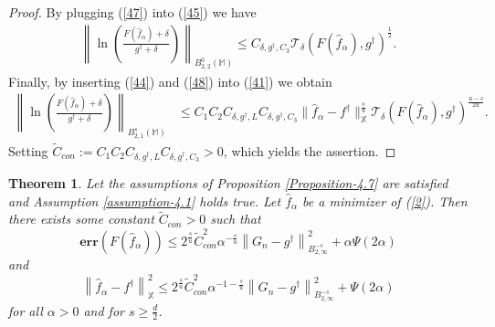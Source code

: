 \documentclass[10pt]{iopart}
\newtheorem{theorem}{Theorem}[section]
\begin{document}
\begin{proof}
By plugging (\ref{47}) into (\ref{45}) we have
\begin{align}\label{48}
 \left\|\ln\left(\frac{F(\widehat{f}_{\alpha})+\delta}{g^{\dagger}+\delta}\right)\right\|_{B_{2,2}^{0}(\mathbb{M})}\leq C_{\delta, g^{\dagger}, C_{3}}
  \mathcal{T}_{\delta}(F(\widehat{f}_{\alpha}), g^{\dagger})^{\frac{1}{2}}.
   \end{align}
Finally, by inserting (\ref{44}) and (\ref{48}) into (\ref{41}) we obtain
\begin{align*}
\left\|\ln\left(\frac{F(\widehat{f}_{\alpha})+\delta}{g^{\dagger}+\delta}\right)\right\|_{B_{2,1}^{s}(\mathbb{M})} 
&\leq C_{1}C_{2}C_{\delta, g^{\dagger}, L}C_{\delta, g^{\dagger}, C_{3}}\|\widehat{f}_{\alpha}-f^{\dagger}\|_{\mathbb{X}}^{\frac{s}{u}}\mathcal{T}_{\delta}(F(\widehat{f}_{\alpha}),
g^{\dagger})^{\frac{u-s}{2u}}.
\end{align*}
Setting $\widetilde{C}_{con}:=C_{1}C_{2}C_{\delta, g^{\dagger}, L}C_{\delta, g^{\dagger}, C_{3}}>0$, which yields the assertion. 
\end{proof}


\begin{theorem}\label{Theorem-4.8}
Let the assumptions of Proposition \ref{Proposition-4.7} are satisfied and Assumption \ref{assumption-4.1} holds true. 
Let $\widehat{f}_{\alpha}$ be a minimizer of (\ref{2}). Then there exists some constant
$\widetilde{C}_{con}>0$ such that
\begin{equation}\label{49}
\mathbf{err}(F(\widehat{f}_{\alpha}))\leq 2^{\frac{s}{u}}\widetilde{C}_{con}^{2}\alpha^{-\frac{s}{u}}
\left\|G_{n}-g^{\dagger}\right\|_{B_{2,\infty}^{-s}}^{2}
+\alpha\Psi(2\alpha)
\end{equation}
and 
\begin{equation}\label{50}
\left\|\widehat{f}_{\alpha}-f^{\dagger}\right\|_{\mathbb{X}}^{2}\leq 2^{\frac{s}{u}}\widetilde{C}_{con}^{2}\alpha^{-1-\frac{s}{u}}
\left\|G_{n}-g^{\dagger}\right\|_{B_{2,\infty}^{-s}}^{2}+\Psi(2\alpha)
\end{equation}
for all $\alpha>0$ and for $s\geq\frac{d}{2}$. 
\end{theorem}
\end{document}

